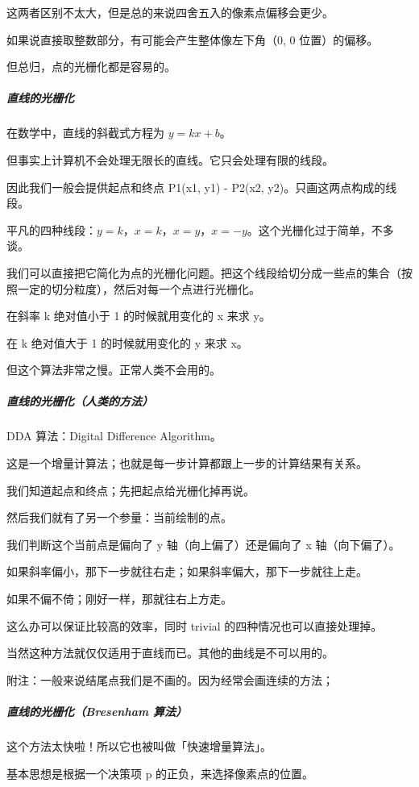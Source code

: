 \documentclass[
]{article}
\begin{document}
这两者区别不太大，但是总的来说四舍五入的像素点偏移会更少。

如果说直接取整数部分，有可能会产生整体像左下角（0, 0 位置）的偏移。

但总归，点的光栅化都是容易的。

\hypertarget{header-n205}{%
\subparagraph{直线的光栅化}\label{header-n205}}

在数学中，直线的斜截式方程为 \(y = k x + b\)。

但事实上计算机不会处理无限长的直线。它只会处理有限的线段。

因此我们一般会提供起点和终点 P1(x1, y1) - P2(x2,
y2)。只画这两点构成的线段。

平凡的四种线段：\(y = k\)，\(x = k\)，\(x = y\)，\(x = -y\)。这个光栅化过于简单，不多谈。

我们可以直接把它简化为点的光栅化问题。把这个线段给切分成一些点的集合（按照一定的切分粒度），然后对每一个点进行光栅化。

在斜率 k 绝对值小于 1 的时候就用变化的 x 来求 y。

在 k 绝对值大于 1 的时候就用变化的 y 来求 x。

但这个算法非常之慢。正常人类不会用的。

\hypertarget{header-n214}{%
\subparagraph{直线的光栅化（人类的方法）}\label{header-n214}}

DDA 算法：Digital Difference Algorithm。

这是一个增量计算法；也就是每一步计算都跟上一步的计算结果有关系。

我们知道起点和终点；先把起点给光栅化掉再说。

然后我们就有了另一个参量：当前绘制的点。

我们判断这个当前点是偏向了 y 轴（向上偏了）还是偏向了 x 轴（向下偏了）。

如果斜率偏小，那下一步就往右走；如果斜率偏大，那下一步就往上走。

如果不偏不倚；刚好一样，那就往右上方走。

这么办可以保证比较高的效率，同时 trivial 的四种情况也可以直接处理掉。

当然这种方法就仅仅适用于直线而已。其他的曲线是不可以用的。

附注：一般来说结尾点我们是不画的。因为经常会画连续的方法；

\hypertarget{header-n225}{%
\subparagraph{直线的光栅化（Bresenham 算法）}\label{header-n225}}

这个方法太快啦！所以它也被叫做「快速增量算法」。

基本思想是根据一个决策项 p 的正负，来选择像素点的位置。
\end{document}
